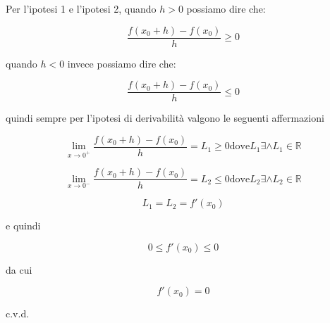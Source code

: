 \documentclass[../dimostrazioni]{subfiles}
\begin{document}
                \smallskip

                Per l'ipotesi 1 e l'ipotesi 2, quando \(h>0\) possiamo dire che:
                
                \[ \frac{f(x_0 + h) - f(x_0)}{h}  \geqslant 0\]

                quando \(h<0\) invece possiamo dire che:

                \[ \frac{f(x_0 + h) - f(x_0)}{h}  \leqslant 0\]

                quindi sempre per l'ipotesi di derivabilità valgono le seguenti affermazioni
                
                \[\lim_{x\to 0^+} \frac{f(x_0 + h) - f(x_0)}{h} = L_1 \geqslant 0 \text{dove} L_1 \exists \land L_1 \in \mathbb{R} \]

                \[\lim_{x\to 0^-} \frac{f(x_0 + h) - f(x_0)}{h} = L_2  \leqslant 0 \text{dove} L_2 \exists \land L_2 \in \mathbb{R} \]

                \[L_1 = L_2 = f'(x_0)\]
                
                e quindi
                
                \[0 \leqslant f'(x_0) \leqslant 0\]
                
                da cui
                
                \[f'(x_0)=0\]
                
                c.v.d.
\end{document}

